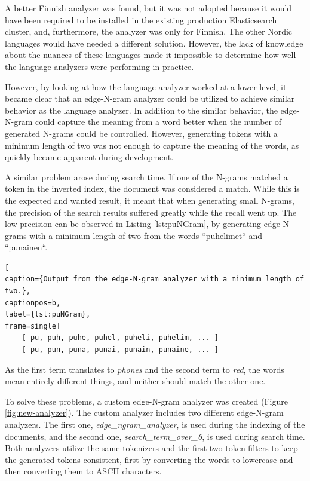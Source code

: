 A better Finnish analyzer was found, but it was not adopted because
it would have been required to be installed in the existing production Elasticsearch cluster, and, furthermore, 
the analyzer was only for Finnish. 
The other Nordic languages would have needed a different solution.
However, the lack of knowledge about the nuances of these languages made it impossible to determine
how well the language analyzers were performing in practice.


However, by looking at how the language analyzer worked at a lower level, it became clear that an edge-N-gram analyzer
could be utilized to achieve similar behavior as the language analyzer.
In addition to the similar behavior, the edge-N-gram could capture the meaning from a word better
when the number of generated N-grams could be controlled.
However, generating tokens with a minimum length of two was not enough to capture the meaning of the words, as 
quickly became apparent during development.


A similar problem arose during search time. 
If one of the N-grams matched a token in the inverted index, the document was considered a match.
While this is the expected and wanted result, it meant that when generating small N-grams, the precision
of the search results suffered greatly while the recall went up.
The low precision can be observed in Listing \ref{lst:puNGram}, by generating edge-N-grams with a minimum length of two from
the words ``puhelimet`` and ``punainen``.
\begin{lstlisting}[
caption={Output from the edge-N-gram analyzer with a minimum length of two.},
captionpos=b,
label={lst:puNGram},
frame=single]
    [ pu, puh, puhe, puhel, puheli, puhelim, ... ]
    [ pu, pun, puna, punai, punain, punaine, ... ]
\end{lstlisting}
As the first term translates to \emph{phones} and the second term to \emph{red}, the words mean entirely different things,
and neither should match the other one.


To solve these problems, a custom edge-N-gram analyzer was created (Figure \ref{fig:new-analyzer}).
The custom analyzer includes two different edge-N-gram analyzers. 
The first one, \emph{edge\_ngram\_analyzer}, is used during the indexing of the documents, 
and the second one, \emph{search\_term\_over\_6}, is used during search time.
Both analyzers utilize the same tokenizers and the first two token filters to keep the generated tokens consistent,
first by converting the words to lowercase and then converting them to ASCII characters.


